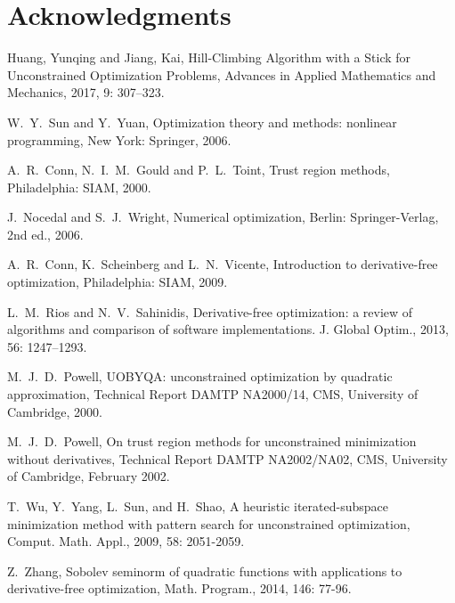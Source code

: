 \documentclass[final,1p,times]{elsarticle}
\begin{document}
\section*{Acknowledgments}


%
%


\begin{thebibliography}{99}

{Huang, Yunqing and Jiang, Kai},
{Hill-Climbing Algorithm with a Stick for Unconstrained Optimization Problems},
{Advances in Applied Mathematics and Mechanics},
2017, 9: 307--323.


W.~Y.~Sun and Y.~Yuan,
Optimization theory and methods: nonlinear programming,
New York: Springer, 2006.

A.~R.~Conn, N.~I.~M.~Gould and P.~L.~Toint,
Trust region methods, Philadelphia: SIAM, 2000.

J.~Nocedal and S.~J.~Wright,
Numerical optimization, 
Berlin: Springer-Verlag, 2nd ed., 2006.

A.~R.~Conn, K.~Scheinberg and L.~N.~Vicente,
Introduction to derivative-free optimization,
Philadelphia: SIAM, 2009.

L.~M.~Rios and N.~V.~Sahinidis,
Derivative-free optimization: a review of algorithms and comparison
  of software implementations.
{J. Global Optim.}, 2013, 56: 1247--1293.

M.~J.~D.~Powell, UOBYQA: unconstrained optimization by quadratic
approximation, Technical Report DAMTP NA2000/14, CMS, University
of Cambridge, 2000.

M.~J.~D.~Powell, On trust region methods for unconstrained
minimization without derivatives, Technical Report DAMTP
NA2002/NA02, CMS, University of Cambridge, February 2002.

T.~Wu, Y.~Yang, L.~Sun, and H.~Shao, A heuristic
iterated-subspace minimization method with pattern search for
unconstrained optimization, 
Comput. Math. Appl., 2009, 58: 2051-2059.

Z.~Zhang, Sobolev seminorm of quadratic functions with
applications to derivative-free optimization, Math. Program.,
2014, 146: 77-96.


\end{thebibliography}
\end{document}
